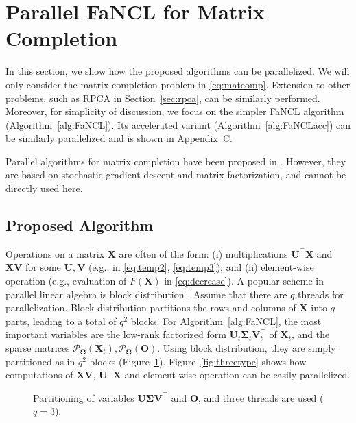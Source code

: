 \documentclass[10pt,journal,compsoc]{IEEEtran}
\newcommand{\X}{\mathbf{X}}
\newcommand{\SO}[1]{\mathcal{P}_{\mathbf{\Omega}}(#1)}
\begin{document}
\section{Parallel \textsf{FaNCL} for Matrix Completion}
\label{sec:parallel}

In this section, we show how the proposed algorithms can be parallelized.
We will only consider the matrix completion problem in \eqref{eq:matcomp}.
Extension to other problems, such as RPCA in Section~\ref{sec:rpca}, can be similarly performed.
Moreover, for simplicity of discussion, we focus on the  simpler
\textsf{FaNCL} algorithm
(Algorithm~\ref{alg:FaNCL}).
Its accelerated variant
(Algorithm~\ref{alg:FaNCLacc}) can be similarly parallelized and is shown in Appendix~C.


Parallel algorithms for matrix completion have been proposed in
\cite{gemulla2011large,yu2012scalable,recht2013parallel}. However,
they are based on stochastic gradient descent and matrix factorization, 
and cannot be directly used here.



\subsection{Proposed Algorithm}
\label{sec:basicidea}

Operations on a matrix $\mathbf{X}$ are often of the form:
(i) multiplications $\mathbf{U}^{\top} \mathbf{X}$ and $\mathbf{X} \mathbf{V}$ for some
$\mathbf{U}, \mathbf{V}$ (e.g., in \eqref{eq:temp2}, \eqref{eq:temp3});
and
(ii) 
element-wise operation (e.g., evaluation of $F(\mathbf{X})$ in 
\eqref{eq:decrease}).
A popular scheme in parallel linear algebra is block distribution \cite{bertsekas1997parallel}.
Assume that there are $q$ threads for parallelization.
Block distribution partitions
the rows and columns of $\mathbf{X}$ into $q$ parts, leading to a total of
$q^2$ blocks.
For Algorithm~\ref{alg:FaNCL}, 
the most important variables are the low-rank factorized form
$\mathbf{U}_t \mathbf{\Sigma}_t \mathbf{V}_t^{\top}$ of $\X_t$, 
and the sparse matrices $\SO{\X_t}, \SO{\mathbf{O}}$.
Using block distribution, they are simply partitioned as in $q^2$ blocks (Figure~\ref{fig:parti}).
Figure~\ref{fig:threetype} shows how computations of $\mathbf{X} \mathbf{V}$,
$\mathbf{U}^{\top} \mathbf{X}$ and element-wise operation can be easily parallelized. 

\begin{figure}[ht]
\centering
{}

\vspace{-10px}
\caption{Partitioning of variables $\mathbf{U} \mathbf{\Sigma} \mathbf{V}^{\top}$ and $\mathbf{O}$, 
	and three threads are used ($q = 3$).}
\label{fig:parti}
\end{figure}
\end{document}
